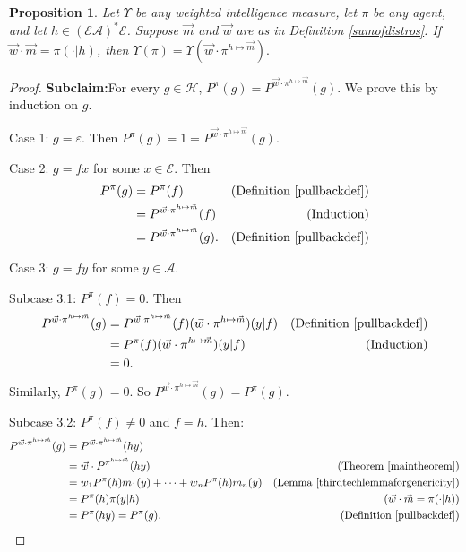 \documentclass[twoside]{article}
\newtheorem{proposition}[theorem]{Proposition}
\begin{document}
\begin{proposition}
\label{longproposition}
    Let $\Upsilon$ be any weighted intelligence measure, let $\pi$ be any agent,
    and let $h\in(\mathcal E\mathcal A)^*\mathcal E$.
    Suppose $\vec m$ and $\vec w$ are as in Definition \ref{sumofdistros}.
    If $\vec w\cdot\vec m = \pi(\cdot|h)$, then
    $
        \Upsilon(\pi)
        =
        \Upsilon(\vec w\cdot \pi^{h\mapsto \vec m}).
    $
\end{proposition}

\begin{proof}
    \textbf{Subclaim:}For every $g\in\mathcal H$,
    $P^\pi(g)=P^{\vec w\cdot\pi^{h\mapsto \vec m}}(g)$.
    We prove this by induction on $g$.

    Case 1: $g=\varepsilon$.
    Then $P^\pi(g)=1
    =P^{\vec w\cdot\pi^{h\mapsto \vec m}}(g)$.

    Case 2: $g=fx$ for some $x\in\mathcal E$.
    Then
    \begin{align*}
        P^\pi(g)
            &= P^\pi(f)
                &\mbox{(Definition \ref{pullbackdef})}\\
            &= P^{\vec w\cdot\pi^{h\mapsto \vec m}}(f)
                &\mbox{(Induction)}\\
            &= P^{\vec w\cdot\pi^{h\mapsto \vec m}}(g).
                &\mbox{(Definition \ref{pullbackdef})}
    \end{align*}

    Case 3: $g=fy$ for some $y\in\mathcal A$.

    Subcase 3.1: $P^\pi(f)=0$.
    Then
    \begin{align*}
        P^{\vec w\cdot\pi^{h\mapsto \vec m}}(g)
            &= P^{\vec w\cdot\pi^{h\mapsto \vec m}}(f)
            (\vec w\cdot\pi^{h\mapsto \vec m})(y|f)
                &\mbox{(Definition \ref{pullbackdef})}\\
            &= P^\pi(f)(\vec w\cdot\pi^{h\mapsto \vec m})(y|f)
                &\mbox{(Induction)}\\
            &= 0.
    \end{align*}
    Similarly, $P^\pi(g)=0$. So $P^{\vec w\cdot\pi^{h\mapsto \vec m}}(g)=P^\pi(g)$.

    Subcase 3.2: $P^\pi(f)\not=0$ and $f=h$. Then:
    \begin{align*}
        P^{\vec w\cdot\pi^{h\mapsto \vec m}}(g)
            &= P^{\vec w\cdot\pi^{h\mapsto \vec m}}(hy)\\
            &= \vec w\cdot{P^{\pi^{h\mapsto \vec m}}}(hy)
                    &\mbox{(Theorem \ref{maintheorem})}\\
            &= w_1P^\pi(h)m_1(y)+\cdots+w_nP^\pi(h)m_n(y)
                    &\mbox{(Lemma \ref{thirdtechlemmaforgenericity})}\\
            &= P^\pi(h)\pi(y|h)
                    &\mbox{($\vec w\cdot\vec m=\pi(\cdot|h)$)}\\
            &= P^\pi(hy) = P^\pi(g).
                    &\mbox{(Definition \ref{pullbackdef})}
    \end{align*}


\end{proof}
\end{document}

